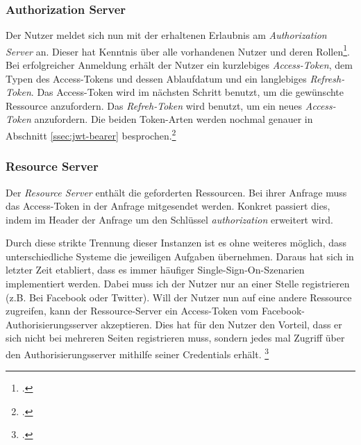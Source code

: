 \subsubsection*{Authorization Server}
\label{sssec:authorization-server}
Der Nutzer meldet sich nun mit der erhaltenen Erlaubnis am \textit{Authorization Server} an. Dieser hat Kenntnis über alle vorhandenen Nutzer und deren Rollen\footcite{online:Implemented_OAuth_Roles}. Bei erfolgreicher Anmeldung erhält der Nutzer ein kurzlebiges \textit{Access-Token}, dem Typen des Access-Tokens und dessen Ablaufdatum und ein langlebiges \textit{Refresh-Token}. Das Access-Token wird im nächsten Schritt benutzt, um die gewünschte Ressource anzufordern. Das \textit{Refreh-Token} wird benutzt, um ein neues \textit{Access-Token} anzufordern. Die beiden Token-Arten werden nochmal genauer in Abschnitt \ref{ssec:jwt-bearer} besprochen.\footcite[S. 287]{book:AngularJs:Steyer2015} 
\subsubsection*{Resource Server}
Der \textit{Resource Server} enthält die geforderten Ressourcen. Bei ihrer Anfrage muss das Access-Token in der Anfrage mitgesendet werden. Konkret passiert dies, indem im Header der Anfrage um den Schlüssel \textit{authorization} erweitert wird.

Durch diese strikte Trennung dieser Instanzen ist es ohne weiteres möglich, dass unterschiedliche Systeme die jeweiligen Aufgaben übernehmen. Daraus hat sich in letzter Zeit etabliert, dass es immer häufiger \ac{Single-Sign-On}-Szenarien implementiert werden. Dabei muss ich der Nutzer nur an einer Stelle registrieren (z.B. Bei Facebook oder Twitter). Will der Nutzer nun auf eine andere Ressource zugreifen, kann der Ressource-Server ein Access-Token vom Facebook-Authorisierungsserver akzeptieren. Dies hat für den Nutzer den Vorteil, dass er sich nicht bei mehreren Seiten registrieren muss, sondern jedes mal Zugriff über den Authorisierungsserver mithilfe seiner Credentials erhält. \footcite[S. 294]{book:AngularJs:Steyer2015} 

